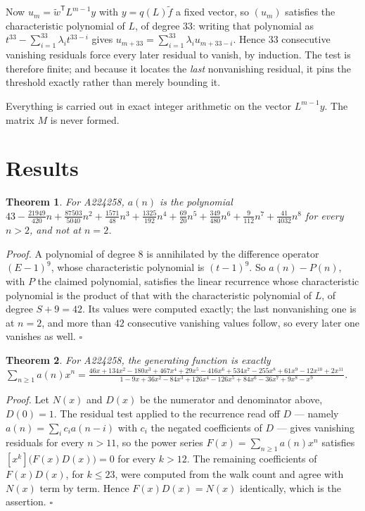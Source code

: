 \documentclass[11pt]{article}
\newtheorem{theorem}{Theorem}
\theoremstyle{definition}
\begin{document}
Now $u_m = \tilde w^{\mathsf T} L^{m-1} y$ with $y = q(L)\tilde f$ a fixed vector, so $(u_m)$ satisfies the characteristic polynomial of $L$, of degree $33$: writing that polynomial as $t^{33} - \sum_{i=1}^{33} \lambda_i t^{33-i}$ gives $u_{m+33} = \sum_{i=1}^{33} \lambda_i u_{m+33-i}$. Hence $33$ consecutive vanishing residuals force every later residual to vanish, by induction. The test is therefore finite; and because it locates the {\itshape last} nonvanishing residual, it pins the threshold exactly rather than merely bounding it.

Everything is carried out in exact integer arithmetic on the vector $L^{m-1}y$. The matrix $M$ is never formed.

\section{Results}

\begin{theorem} For A224258, $a(n)$ is the polynomial $43 - \frac{21949}{420}n + \frac{87503}{5040}n^{2} + \frac{1571}{48}n^{3} + \frac{1325}{192}n^{4} + \frac{69}{20}n^{5} + \frac{349}{480}n^{6} + \frac{9}{112}n^{7} + \frac{41}{4032}n^{8}$ for every $n > 2$, and not at $n = 2$.\end{theorem}

{\itshape Proof.} A polynomial of degree $8$ is annihilated by the difference operator $(E-1)^{9}$, whose characteristic polynomial is $(t-1)^{9}$. So $a(n) - P(n)$, with $P$ the claimed polynomial, satisfies the linear recurrence whose characteristic polynomial is the product of that with the characteristic polynomial of $L$, of degree $S + 9 = 42$. Its values were computed exactly; the last nonvanishing one is at $n = 2$, and more than $42$ consecutive vanishing values follow, so every later one vanishes as well. $\square$

\begin{theorem} For A224258, the generating function is exactly $\sum_{n\ge 1} a(n)x^n = \frac{46x + 134x^{2} - 180x^{3} + 467x^{4} + 29x^{5} - 416x^{6} + 534x^{7} - 255x^{8} + 61x^{9} - 12x^{10} + 2x^{11}}{1 - 9x + 36x^{2} - 84x^{3} + 126x^{4} - 126x^{5} + 84x^{6} - 36x^{7} + 9x^{8} - x^{9}}$.\end{theorem}

{\itshape Proof.} Let $N(x)$ and $D(x)$ be the numerator and denominator above, $D(0)=1$. The residual test applied to the recurrence read off $D$ --- namely $a(n) = \sum_i c_i a(n-i)$ with $c_i$ the negated coefficients of $D$ --- gives vanishing residuals for every $n > 11$, so the power series $F(x)=\sum_{n\ge 1}a(n)x^n$ satisfies $[x^k]\bigl(F(x)D(x)\bigr) = 0$ for every $k > 12$. The remaining coefficients of $F(x)D(x)$, for $k \le 23$, were computed from the walk count and agree with $N(x)$ term by term. Hence $F(x)D(x) = N(x)$ identically, which is the assertion. $\square$
\end{document}
